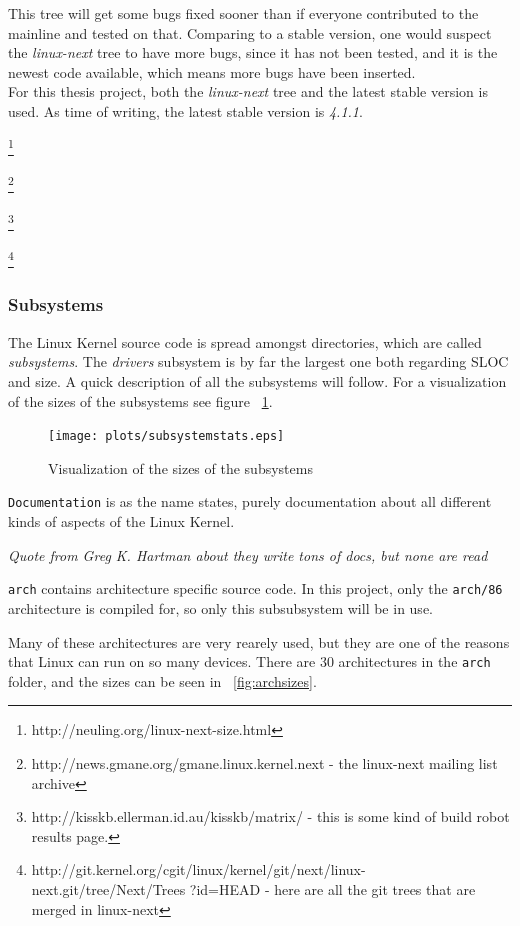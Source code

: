 \documentclass[a4paper,11pt]{article}
\newcommand{\textcode}[1]{
    \texttt{\colorbox{gray!20}{#1}}
}
\newcommand{\figa}{
    \begin{figure}[!htpb]
    \centering
}
\newcommand{\figb}[2]{
    \caption{#1}
    \label{#2}
    \end{figure}
}
\begin{document}
This tree will get some bugs fixed sooner than if everyone contributed to the 
mainline and tested on that. Comparing to a stable version, one would suspect 
the \emph{linux-next} tree to have more bugs, since it has not been tested, 
and it is the newest code available, which means more bugs have been inserted. 
\\


For this thesis project, both the \emph{linux-next} tree and the latest stable 
version is used. As time of writing, the latest stable version is \emph{4.1.1}.

\footnote{http://neuling.org/linux-next-size.html}

\footnote{http://news.gmane.org/gmane.linux.kernel.next - the linux-next 
mailing list archive}

\footnote{http://kisskb.ellerman.id.au/kisskb/matrix/ - this is some kind of 
build robot results page.}

\footnote{
http://git.kernel.org/cgit/linux/kernel/git/next/linux-next.git/tree/Next/Trees
?id=HEAD - here are all the git trees that are merged in linux-next}


\subsubsection{Subsystems}

The Linux Kernel source code is spread amongst directories, which are called 
\emph{subsystems}. The \emph{drivers} subsystem is by far the largest one both 
regarding SLOC and size. A quick description of all the subsystems will follow. 
For a visualization of the sizes of the subsystems see figure 
~\ref{fig:subsystems}.


\figa
    \texttt{[image: plots/subsystemstats.eps]}
\figb{Visualization of the sizes of the subsystems}{fig:subsystems}


\textcode{Documentation} is as the name states, purely documentation about all 
different kinds of aspects of the Linux Kernel.

\begin{center}
    \emph{Quote from Greg K. Hartman about they write tons of docs, but none 
    are read}
\end{center}


\textcode{arch} contains architecture specific source code. In this project, 
only the \textcode{arch/86} architecture is compiled for, so only this 
subsubsystem will be in use. 

Many of these architectures are very rearely used, but they are one of the 
reasons that Linux can run on so many devices. There are 30 architectures in 
the \textcode{arch} folder, and the sizes can be seen in ~\ref{fig:archsizes}.
\end{document}
